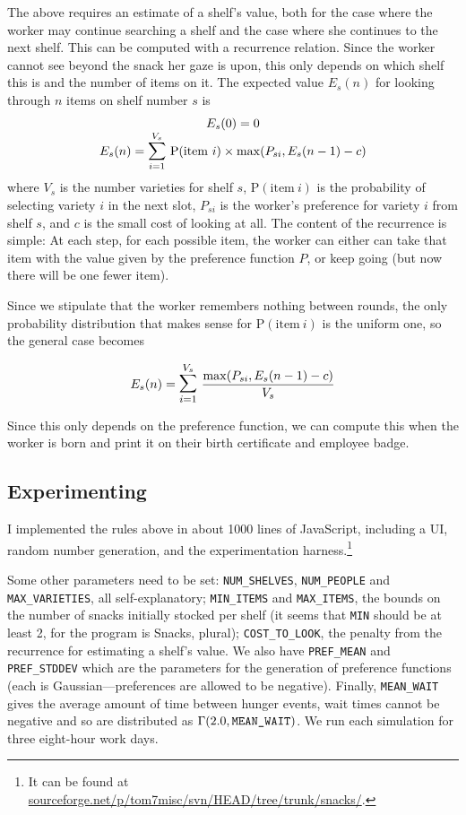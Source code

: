 \documentclass[twocolumn]{article}
\begin{document}
\medskip
The above requires an estimate of a shelf's value, both for the case where the worker may continue searching a shelf and the case where she continues to the next shelf. This can be computed with a recurrence relation. Since the worker cannot see beyond the snack her gaze is upon, this only depends on which shelf this is and the number of items on it. The expected value $E_s(n)$ for looking through $n$ items on shelf number $s$ is
%
$$
\begin{array}{c}
E_s(0) = 0 \\
E_s(n) = \mathlarger{\mathlarger{\sum}}_{i=1}^{V_s}\ \mathrm{P}(\mathrm{item}\ i) \times \mathrm{max}(P_{si}, E_s(n - 1) - c)
\end{array}
$$
%
where $V_s$ is the number varieties for shelf $s$, $\mathrm{P}(\mathrm{item}\ i)$ is the probability of selecting variety $i$ in the next slot, $P_{si}$ is the worker's preference for variety $i$ from shelf $s$, and $c$ is the small cost of looking at all. The content of the recurrence is simple: At each step, for each possible item, the worker can either can take that item with the value given by the preference function $P$, or keep going (but now there will be one fewer item).

Since we stipulate that the worker remembers nothing between rounds, the only probability distribution that makes sense for $\mathrm{P}(\mathrm{item}\ i)$ is the uniform one, so the general case becomes

$$
E_s(n) = \mathlarger{\mathlarger{\sum}}_{i=1}^{V_s}\ \frac{\mathrm{max}(P_{si}, E_s(n - 1) - c)}{V_s}
$$

Since this only depends on the preference function, we can compute this when the worker is born and print it on their birth certificate and employee badge.

\subsection{Experimenting}

I implemented the rules above in about 1000 lines of JavaScript,
including a UI, random number generation, and the experimentation harness.\footnote{It can be found at \url{sourceforge.net/p/tom7misc/svn/HEAD/tree/trunk/snacks/}.} 

Some other parameters need to be set: \verb+NUM_SHELVES+, \verb+NUM_PEOPLE+ and \verb+MAX_VARIETIES+, all self-explanatory; \verb+MIN_ITEMS+ and \verb+MAX_ITEMS+, the bounds on the number of snacks initially stocked per shelf (it seems that \verb+MIN+ should be at least 2, for the program is Snacks, plural); \verb+COST_TO_LOOK+, the penalty from the recurrence for estimating a shelf's value. We also have \verb+PREF_MEAN+ and \verb+PREF_STDDEV+ which are the parameters for the generation of preference functions (each is Gaussian---preferences are allowed to be negative). Finally, \verb+MEAN_WAIT+ gives the average amount of time between hunger events, wait times cannot be negative and so are distributed as $\Gamma(2.0, \verb+MEAN_WAIT+)$. We run each simulation for three eight-hour work days.
\end{document}

